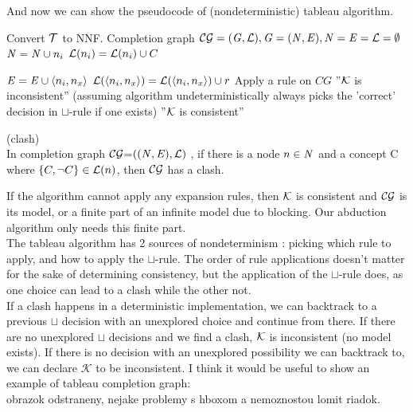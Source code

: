 And now we can show the pseudocode of (nondeterministic) tableau algorithm.

\begin{algorithm}[t!]
    \begin{algorithmic}[1]
			\State Convert $\mathcal{T}$ to NNF.
			\State Completion graph $\mathcal{CG} =(\mathit{G},\mathcal{L}) , \mathit{G}=(\mathit{N},\mathit{E}), \mathit{N} = \mathit{E} = \mathcal{L} =\emptyset$
				\State $\mathit{N} = \mathit{N} \cup n_i$
					\State $\mathcal{L} (n_i) = \mathcal{L} (n_i) \cup C$
				\EndFor
				
					\State $\mathit{E} = \mathit{E} \cup \langle n_i,n_x \rangle$
					\State $\mathcal{L} (\langle n_i,n_x \rangle) = \mathcal{L} (\langle n_i,n_x \rangle)  \cup r$
				\EndFor  
			\EndFor
				\State Apply a rule on $CG$
					\State \Return ''$\mathcal{K}$ is inconsistent''  (assuming algorithm undeterministically always picks the 'correct' decision in $\sqcup$-rule if one exists)
				\EndIf
			\EndWhile
			\State \Return ''$\mathcal{K}$ is consistent''
			\EndFunction

    \end{algorithmic}
\end{algorithm}

	\begin{mydef} (clash)\\
		In completion graph $\mathcal{CG}$=$( (\mathit{N}, \mathit{E}),\mathcal{L})$ , if there is a node $n \in \mathit{N}$ and a concept C where $\{ C , \neg C \} \in \mathcal{L} (n)$, then $\mathcal{CG}$ has a clash.
	
\end{mydef}
If the algorithm cannot apply any expansion rules, then $\mathcal{K}$ is consistent and $\mathcal{CG}$ is its model, or a finite part of an infinite model due to blocking. Our abduction algorithm only needs this finite part.\\
 The tableau algorithm has 2 sources of nondeterminism : picking which rule to apply, and how to apply the $\sqcup$-rule. The order of rule applications doesn't matter for the sake of determining consistency, but the application of the $\sqcup$-rule does, as one choice can lead to a clash while the other not. \\ 
If a clash happens in a deterministic implementation, we can backtrack to a previous $\sqcup$ decision with an unexplored choice and continue from there. If there are no unexplored $\sqcup$ decisions and we find a clash, $\mathcal{K}$ is inconsistent (no model exists).     
If there is no decision with an unexplored possibility we can backtrack to, we can declare $\mathcal{K}$ to be inconsistent. 
I think it would be useful to show an example of tableau completion graph:
\\
obrazok odstraneny, nejake problemy s hboxom a nemoznostou lomit riadok.

